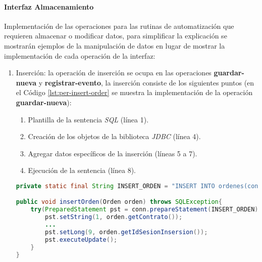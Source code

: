 \paragraph{\indent Interfaz Almacenamiento\\}
Implementación de las operaciones para las rutinas de automatización que requieren almacenar o modificar datos, para simplificar la explicación se mostrarán ejemplos de la manipulación de datos en lugar de mostrar la implementación de cada operación de la interfaz:
\begin{enumerate}
	\item Inserción: la operación de inserción se ocupa en las operaciones \textbf{guardar-nueva} y \textbf{registrar-evento}, la inserción consiste de los siguientes puntos (en el Código \ref{lst:per-insert-order} se muestra la implementación de la operación \textbf{guardar-nueva}):
	\begin{enumerate}
		\item Plantilla de la sentencia \textit{SQL} (línea 1).
		\item Creación de los objetos de la biblioteca \textit{JDBC} (línea 4).
		\item Agregar datos específicos de la inserción (líneas 5 a 7).
		\item Ejecución de la sentencia (línea 8).
	\end{enumerate}

	\begin{lstlisting}[language=Java, caption={Inserción de una nueva orden de reposición en la base de datos.}, captionpos=b, label={lst:per-insert-order}]
private static final String INSERT_ORDEN = "INSERT INTO ordenes(contrato, solicitud, orden, fecha_expedicion, almacen_destino, url_con, url_env, estatus, id_sesion_insersion, id_sesion_estatus, fecha_estatus) VALUES(?, ?, ?, ?, ?, ?, ?, 1, ?, ?, CURRENT_TIMESTAMP)";

public void insertOrden(Orden orden) throws SQLException{
    try(PreparedStatement pst = conn.prepareStatement(INSERT_ORDEN)){
	    pst.setString(1, orden.getContrato());
	    ...
	    pst.setLong(9, orden.getIdSesionInsersion());
	    pst.executeUpdate();
	}
}
	\end{lstlisting}


\end{enumerate}
